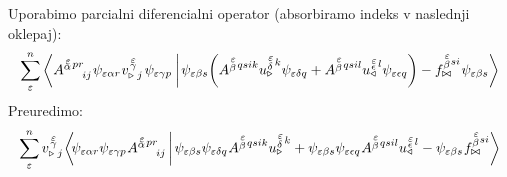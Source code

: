 Uporabimo parcialni diferencialni operator (absorbiramo indeks v naslednji oklepaj):
\begin{equation*}
   \sum^n_\varepsilon
   \braket{
      A^{\substack{\mkern2mu \varepsilon \\[-0.65mm] \alpha} \mkern2mu p r}_{\mkern29mu i j}
         \mkern1mu
      \psi_{ \varepsilon \alpha r}
         \mkern1mu
      v^{\mkern 2mu \substack{\varepsilon \\[-0.65mm] \gamma \\[-0.2mm]}}_{\triangleright \mkern5mu j} \mkern2mu
      \psi_{\varepsilon \gamma p} \mkern4mu}
   {
         \mkern2mu
      \psi_{\varepsilon \beta s} 
      \qty( A^{\substack{\mkern2mu \varepsilon \\[0.05mm] \beta} \mkern2mu q s i k} u^{\substack{\mkern2mu \varepsilon \\[0.10mm] \delta} \mkern2mu k}_\triangleright
      \psi_{\varepsilon \delta q}
      +
      A^{\substack{\mkern2mu \varepsilon \\[0.05mm] \beta} \mkern2mu q s i l}
      u^{\substack{\mkern2mu \varepsilon \\[-0.55mm] \epsilon} \mkern2mu l}_\triangleleft
      \psi_{\varepsilon \epsilon q} )
      -
      f^{\substack{\mkern2mu \varepsilon \\[0.05mm] \beta} \mkern1mu s i}_{\bowtie} \mkern1mu
      \psi_{\varepsilon \beta s} }
\end{equation*}
Preuredimo:
\begin{equation*}
   \sum^n_\varepsilon
   v^{\mkern 2mu \substack{\varepsilon \\[-0.65mm] \gamma \\[-0.2mm]}}_{\triangleright \mkern5mu j} \mkern-2mu
   \braket{
      \mkern-4mu \psi_{ \varepsilon \alpha r}
      \psi_{\varepsilon \gamma p} \mkern1mu
      A^{\substack{\mkern2mu \varepsilon \\[-0.65mm] \alpha} \mkern2mu p r}_{\mkern29mu i j}  \mkern3mu }
   {
      \mkern2mu \psi_{\varepsilon \beta s}
      \psi_{\varepsilon \delta q} \mkern1mu
      A^{\substack{\mkern2mu \varepsilon \\[0.05mm] \beta} \mkern2mu q s i k}
      u^{\substack{\mkern2mu \varepsilon \\[0.09mm] \delta} \mkern2mu k}_\triangleright
      +
      \psi_{\varepsilon \beta s}
      \psi_{\varepsilon \epsilon q} \mkern1mu
      A^{\substack{\mkern2mu \varepsilon \\[0.05mm] \beta} \mkern2mu q s i l}
      u^{\substack{\mkern2mu \varepsilon \\[-0.55mm] \epsilon} \mkern2mu l}_\triangleleft
      -
      \psi_{\varepsilon \beta s} \mkern1mu
      f^{\substack{\mkern2mu \varepsilon \\[0.05mm] \beta} \mkern1mu s i}_{\bowtie} }
\end{equation*}
